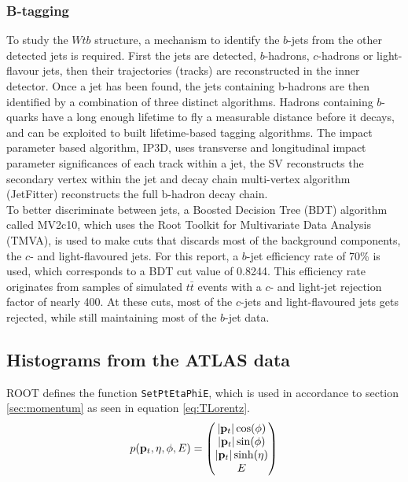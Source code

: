\documentclass[12pt,a4paper]{article}
\numberwithin{equation}{section}
\begin{document}
\subsubsection{B-tagging}
To study the $Wtb$ structure, a mechanism to identify the $b$-jets from the
other detected jets is required. First the jets are detected, $b$-hadrons,
$c$-hadrons or light-flavour jets, then their trajectories (tracks) are
reconstructed in the inner detector. Once a jet has been found, the jets
containing b-hadrons are then identified by a combination of three distinct
algorithms. Hadrons containing $b$-quarks have a long enough lifetime to fly a
measurable distance before it decays, and can be exploited to built
lifetime-based tagging algorithms. The impact parameter based algorithm, IP3D,
uses transverse and longitudinal impact parameter significances of each track
within a jet, the SV reconstructs the secondary vertex within the jet and decay
chain multi-vertex algorithm (JetFitter) reconstructs the full b-hadron
decay chain.\\

To better discriminate between jets, a Boosted Decision Tree (BDT) algorithm
called MV2c10, which uses the Root Toolkit for Multivariate Data Analysis
(TMVA), is used to make cuts that discards most of the background components,
the $c$- and light-flavoured jets. For this report, a $b$-jet efficiency rate of
70\% is used, which corresponds to a BDT cut value of 0.8244. This efficiency
rate originates from samples of simulated $t\bar t$ events with a $c$- and
light-jet rejection factor of nearly 400\cite{ATL-PHYS-PUB-2016-012}. At these
cuts, most of the $c$-jets and light-flavoured jets gets rejected, while still
maintaining most of the $b$-jet data.



\subsection{Histograms from the ATLAS data}
ROOT defines the function \texttt{SetPtEtaPhiE}, which is used in accordance to section \ref{sec:momentum} as seen in equation \eqref{eq:TLorentz}.
\begin{equation} \label{eq:TLorentz}
p({\vb p_t}, \eta, \phi, E) =
\begin{pmatrix}
|{\vb p_t}| \cos(\phi)\\ |{\vb p_t}|\sin(\phi)\\ |{\vb p_t}| \sinh(\eta)\\ E
\end{pmatrix}
\end{equation}
\end{document}
